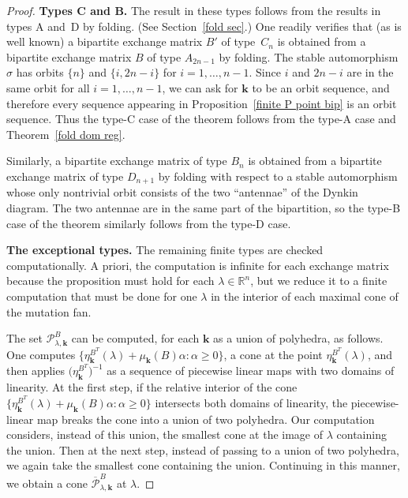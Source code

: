 \documentclass[10pt]{article}
\theoremstyle{definition}
\theoremstyle{remark}
\numberwithin{equation}{section}
\newcommand{\reals}{\mathbb R}
\newcommand{\set}[1]{{\lbrace #1 \rbrace}}
\newcommand{\sett}[1]{{\bigl\lbrace #1 \bigr\rbrace}}
\newcommand{\0}{{\mathbf{0}}}
\newcommand{\kk}{{\boldsymbol{k}}}
\renewcommand{\P}{\mathcal{P}}
\begin{document}
\begin{proof}
\medskip

\noindent
\textbf{Types C and B.} 
The result in these types follows from the results in types A and~D by folding.
(See Section~\ref{fold sec}.)
One readily verifies that (as is well known) a bipartite exchange matrix $B'$ of type~$C_n$ is obtained from a bipartite exchange matrix $B$ of type $A_{2n-1}$ by folding.
The stable automorphism $\sigma$ has orbits $\set{n}$ and $\set{i,2n-i}$ for $i=1,\ldots,n-1$.
Since $i$ and $2n-i$ are in the same orbit for all $i=1,\ldots,n-1$, we can ask for $\kk$ to be an orbit sequence, and therefore every sequence appearing in Proposition~\ref{finite P point bip} is an orbit sequence.
Thus the type-C case of the theorem follows from the type-A case and Theorem~\ref{fold dom reg}.

Similarly, a bipartite exchange matrix of type $B_n$ is obtained from a bipartite exchange matrix of type $D_{n+1}$ by folding with respect to a stable automorphism whose only nontrivial orbit consists of the two ``antennae'' of the Dynkin diagram.
The two antennae are in the same part of the bipartition, so the type-B case of the theorem similarly follows from the type-D case.

\medskip

\noindent
\textbf{The exceptional types.}
The remaining finite types are checked computationally.
A priori, the computation is infinite for each exchange matrix because the proposition must hold for each $\lambda\in\reals^n$, but we reduce it to a finite computation that must be done for one $\lambda$ in the interior of each maximal cone of the mutation fan.

The set $\P^B_{\lambda,\kk}$ can be computed, for each $\kk$ as a union of polyhedra, as follows.
One computes $\sett{\eta_\kk^{B^T}(\lambda)+\mu_\kk(B)\alpha:\alpha\ge0}$, a cone at the point $\eta_\kk^{B^T}(\lambda)$, and then applies $\bigl(\eta_{\kk}^{B^T}\bigr)^{-1}$ as a sequence of piecewise linear maps with two domains of linearity.
At the first step, if the relative interior of the cone $\sett{\eta_\kk^{B^T}(\lambda)+\mu_\kk(B)\alpha:\alpha\ge0}$ intersects both domains of linearity, the piecewise-linear map breaks the cone into a union of two polyhedra.
Our computation considers, instead of this union, the smallest cone at the image of $\lambda$ containing the union.
Then at the next step, instead of passing to a union of two polyhedra, we again take the smallest cone containing the union.  
Continuing in this manner, we obtain a cone $\overline{\P}^B_{\lambda,\kk}$ at $\lambda$.


\end{proof}
\end{document}

